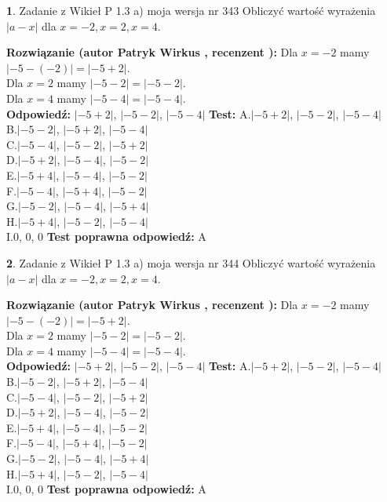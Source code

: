 \documentclass[12pt, a4paper]{article}
\theoremstyle{definition} %
\newtheorem{zad}{}
\newcommand{\zadStart}[1]{\begin{zad}#1\newline}
\newcommand{\zadStop}{\end{zad}}
\newcommand{\rozwStart}[2]{\noindent \textbf{Rozwiązanie (autor #1 , recenzent #2): }\newline}
\newcommand{\rozwStop}{\newline}
\newcommand{\odpStart}{\noindent \textbf{Odpowiedź:}\newline}
\newcommand{\odpStop}{\newline}
\newcommand{\testStart}{\noindent \textbf{Test:}\newline}
\newcommand{\testStop}{\newline}
\newcommand{\kluczStart}{\noindent \textbf{Test poprawna odpowiedź:}\newline}
\newcommand{\kluczStop}{\newline}
\begin{document}
\zadStart{Zadanie z Wikieł P 1.3 a) moja wersja nr 343}
Obliczyć wartość wyrażenia $|a - x|$ dla $x=-2,x=2,x=4$.
\zadStop
\rozwStart{Patryk Wirkus}{}
Dla $x = -2$ mamy $|-5 - (-2)| = |-5 + 2|$.\\
Dla $x = 2$ mamy $|-5 - 2| = |-5 - 2|$.\\
Dla $x = 4$ mamy $|-5 - 4| = |-5 - 4|$.\\
\rozwStop
\odpStart
$|-5 + 2|$, $|-5 - 2|$, $|-5 - 4|$
\odpStop
\testStart
A.$|-5 + 2|$, $|-5 - 2|$, $|-5 - 4|$\\
B.$|-5 - 2|$, $|-5 + 2|$, $|-5 - 4|$\\
C.$|-5 - 4|$, $|-5 - 2|$, $|-5 + 2|$\\
D.$|-5 + 2|$, $|-5 - 4|$, $|-5 - 2|$\\
E.$|-5 + 4|$, $|-5 - 4|$, $|-5 - 2|$\\
F.$|-5 - 4|$, $|-5 + 4|$, $|-5 - 2|$\\
G.$|-5 - 2|$, $|-5 - 4|$, $|-5 + 4|$\\
H.$|-5 + 4|$, $|-5 - 2|$, $|-5 - 4|$\\
I.$0$, $0$, $0$
\testStop
\kluczStart
A
\kluczStop



\zadStart{Zadanie z Wikieł P 1.3 a) moja wersja nr 344}
Obliczyć wartość wyrażenia $|a - x|$ dla $x=-2,x=2,x=4$.
\zadStop
\rozwStart{Patryk Wirkus}{}
Dla $x = -2$ mamy $|-5 - (-2)| = |-5 + 2|$.\\
Dla $x = 2$ mamy $|-5 - 2| = |-5 - 2|$.\\
Dla $x = 4$ mamy $|-5 - 4| = |-5 - 4|$.\\
\rozwStop
\odpStart
$|-5 + 2|$, $|-5 - 2|$, $|-5 - 4|$
\odpStop
\testStart
A.$|-5 + 2|$, $|-5 - 2|$, $|-5 - 4|$\\
B.$|-5 - 2|$, $|-5 + 2|$, $|-5 - 4|$\\
C.$|-5 - 4|$, $|-5 - 2|$, $|-5 + 2|$\\
D.$|-5 + 2|$, $|-5 - 4|$, $|-5 - 2|$\\
E.$|-5 + 4|$, $|-5 - 4|$, $|-5 - 2|$\\
F.$|-5 - 4|$, $|-5 + 4|$, $|-5 - 2|$\\
G.$|-5 - 2|$, $|-5 - 4|$, $|-5 + 4|$\\
H.$|-5 + 4|$, $|-5 - 2|$, $|-5 - 4|$\\
I.$0$, $0$, $0$
\testStop
\kluczStart
A
\kluczStop
\end{document}

